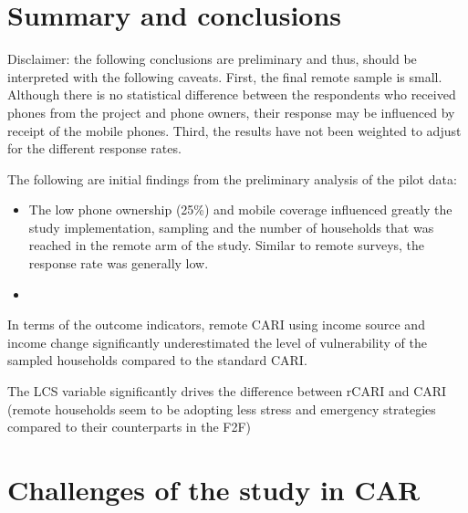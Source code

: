\documentclass[11pt,harvard]{article}
\begin{document}
	\pagebreak

	
	\section{Summary and conclusions}
	
	Disclaimer: the following conclusions are preliminary and thus, should be interpreted with the following caveats. First, the final remote sample is small. Although there is no statistical difference between the respondents who received phones from the project and phone owners, their response may be influenced by receipt of the mobile phones. Third, the results have not been weighted to adjust for the different response rates.  
	
	The following are initial findings from the preliminary analysis of the pilot data:
	\begin{itemize}[label=--, left=1.5em]
		\item The low phone ownership (25\%) and mobile coverage influenced greatly the study implementation, sampling and the number of households that was reached in the remote arm of the study. Similar to remote surveys, the response rate was generally low.
		\item 
	\end{itemize}
	 
	
	
	
	In terms of the outcome indicators, remote CARI using income source and income change significantly underestimated the level of vulnerability of the sampled households compared to the standard CARI.
	
	The LCS variable significantly drives the difference between rCARI and CARI (remote households seem to be adopting less stress and emergency strategies compared to their counterparts in the F2F)
	
	
	
	
	\pagebreak
	

	\section{Challenges of the study in CAR}
\end{document}
